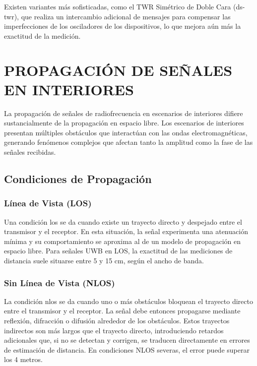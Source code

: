 Existen variantes más sofisticadas, como el TWR Simétrico de Doble Cara (\gls{ds-twr}), que realiza un intercambio adicional de mensajes para compensar las imperfecciones de los osciladores de los dispositivos, lo que mejora aún más la exactitud de la medición.


\section{PROPAGACIÓN DE SEÑALES EN INTERIORES}
\label{sec:propagacion_interiores}

La propagación de señales de radiofrecuencia en escenarios de interiores difiere sustancialmente de la propagación en espacio libre. Los escenarios de interiores presentan múltiples obstáculos que interactúan con las ondas electromagnéticas, generando fenómenos complejos que afectan tanto la amplitud como la fase de las señales recibidas.

\subsection{Condiciones de Propagación}

\subsubsection{Línea de Vista (LOS)}

Una condición \gls{los} se da cuando existe un trayecto directo y despejado entre el transmisor y el receptor. En esta situación, la señal experimenta una atenuación mínima y su comportamiento se aproxima al de un modelo de propagación en espacio libre. Para señales UWB en LOS, la exactitud de las mediciones de distancia suele situarse entre 5 y 15 cm, según el ancho de banda.

\subsubsection{Sin Línea de Vista (NLOS)}

La condición \gls{nlos} se da cuando uno o más obstáculos bloquean el trayecto directo entre el transmisor y el receptor. La señal debe entonces propagarse mediante reflexión, difracción o difusión alrededor de los obstáculos. Estos trayectos indirectos son más largos que el trayecto directo, introduciendo retardos adicionales que, si no se detectan y corrigen, se traducen directamente en errores de estimación de distancia. En condiciones NLOS severas, el error puede superar los 4 metros.

